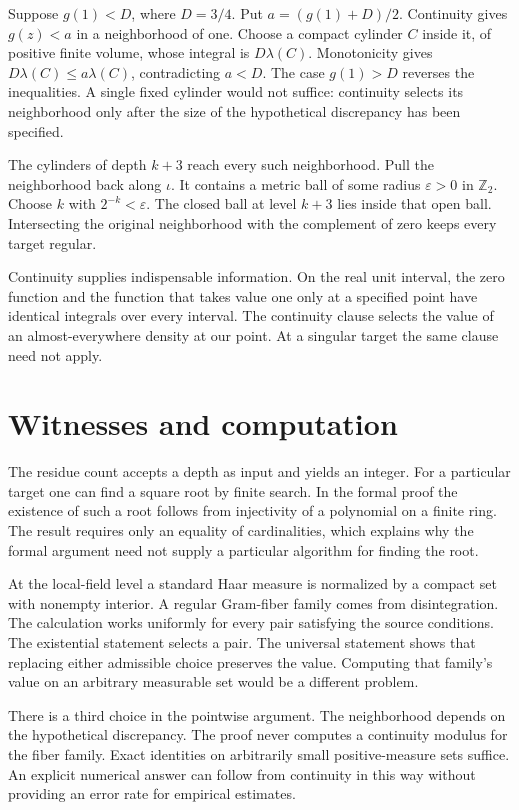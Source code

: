 \documentclass[12pt,letterpaper]{article}
\begin{document}
Suppose $g(1)<D$, where $D=3/4$. Put $a=(g(1)+D)/2$. Continuity gives $g(z)<a$ in a neighborhood of one. Choose a compact cylinder $C$ inside it, of positive finite volume, whose integral is $D\lambda(C)$. Monotonicity gives $D\lambda(C)\le a\lambda(C)$, contradicting $a<D$. The case $g(1)>D$ reverses the inequalities. A single fixed cylinder would not suffice: continuity selects its neighborhood only after the size of the hypothetical discrepancy has been specified.

The cylinders of depth $k+3$ reach every such neighborhood. Pull the neighborhood back along $\iota$. It contains a metric ball of some radius $\varepsilon>0$ in $\mathbb Z_2$. Choose $k$ with $2^{-k}<\varepsilon$. The closed ball at level $k+3$ lies inside that open ball. Intersecting the original neighborhood with the complement of zero keeps every target regular.

Continuity supplies indispensable information. On the real unit interval, the zero function and the function that takes value one only at a specified point have identical integrals over every interval. The continuity clause selects the value of an almost-everywhere density at our point. At a singular target the same clause need not apply.
\section{Witnesses and computation}
The residue count accepts a depth as input and yields an integer. For a particular target one can find a square root by finite search. In the formal proof the existence of such a root follows from injectivity of a polynomial on a finite ring. The result requires only an equality of cardinalities, which explains why the formal argument need not supply a particular algorithm for finding the root.

At the local-field level a standard Haar measure is normalized by a compact set with nonempty interior. A regular Gram-fiber family comes from disintegration. The calculation works uniformly for every pair satisfying the source conditions. The existential statement selects a pair. The universal statement shows that replacing either admissible choice preserves the value. Computing that family's value on an arbitrary measurable set would be a different problem.

There is a third choice in the pointwise argument. The neighborhood depends on the hypothetical discrepancy. The proof never computes a continuity modulus for the fiber family. Exact identities on arbitrarily small positive-measure sets suffice. An explicit numerical answer can follow from continuity in this way without providing an error rate for empirical estimates.
\end{document}
